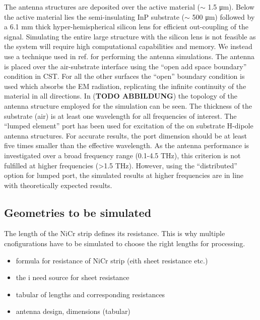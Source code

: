 \documentclass[
	german,%
	accentcolor=9c,%
	ruledheaders=section,%
	class=report,%
	thesis={type=bachelor},%
	fontsize=11pt,%
	parskip=half-,%
	custommargins=false,%
	marginpar=false,%
	BCOR=5mm,%
 	logofile=tools/logo-installation/TUDa-logos/tuda_logo.png,%
]{tudapub}
\begin{document}
The antenna structures are deposited over the active material ($\sim$ \num{1.5} \si{\micro\meter}). Below the active material lies the semi-insulating InP substrate ($\sim$ \num{500} \si{\micro\meter}) followed by a \num{6.1} \si{\milli\meter} thick hyper-hemispherical silicon lens for efficient out-coupling of the signal. Simulating the entire large structure with the silicon lens is not feasible as the system will require high computational capabilities and memory. We instead use a technique used in ref. \cite{llombartTHzTimeDomainSensing2012,garufoNortonEquivalentCircuit2018} for performing the antenna simulations. The antenna is placed over the air-substrate interface using the \enquote{open add space boundary} condition in CST. For all the other surfaces the \enquote{open} boundary condition is used which absorbs the EM radiation, replicating the infinite continuity of the material in all directions. In (\textbf{TODO ABBILDUNG}) the topology of the antenna structure employed for the simulation can be seen. The thickness of the substrate (air) is at least one wavelength for all frequencies of interest. The \enquote{lumped element} port has been used for excitation of the on substrate H-dipole antenna structures. For accurate results, the port dimension should be at least five times smaller than the effective wavelength. As the antenna performance is investigated over a broad frequency range (0.1-4.5 THz), this criterion is not fulfilled at higher frequencies (>1.5 THz). However, using the \enquote{distributed} option for lumped port, the simulated results at higher frequencies are in line with theoretically expected results.

\subsection{Geometries to be simulated}
The length of the NiCr strip defines its resistance. This is why multiple cnofigurations have to be simulated to choose the right lengths for processing. 

\begin{itemize}
	\item formula for resistance of NiCr strip (eith sheet resistance etc.)
	\item the i need source for sheet resistance 
	\item tabular of lengths and corresponding resistances 
\end{itemize}


\begin{itemize}
	\item antenna design, dimensions (tabular)
\end{itemize}
\end{document}
